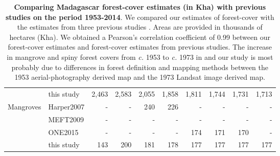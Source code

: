 \documentclass[a4paper, 12pt, leqno]{article} %
\begin{document}
\begin{table}[!h]
\begin{longtable}[]{@{}llrrrrrrrr@{}}
                & this study & 2,463 & 2,583 & 2,055 & 1,858 & 1,811 & 1,744 & 1,731 &
                                                                                       1,713 \\
    Mangroves & Harper2007 & - & - & 240 & 226 & - & - & - &
                                                             - \\
                & MEFT2009 & - & - & - & - & - & - & - & - \\
                & ONE2015 & - & - & - & - & 174 & 171 & 170 & - \\
                & this study & 143 & 200 & 181 & 178 & 177 & 177 & 177 &
                                                                         177 \\
    \bottomrule
  \end{longtable}%
  \addtocounter{table}{-1}

  \caption{\textbf{Comparing Madagascar forest-cover estimates (in
      Kha) with previous studies on the period 1953-2014}. We compared
    our estimates of forest-cover with the estimates from three
    previous studies \citep{Harper2007, MEFT2009, ONE2015}. Areas are
    provided in thousands of hectares (Kha). We obtained a Pearson's
    correlation coefficient of 0.99 between our forest-cover estimates
    and forest-cover estimates from previous studies. The increase in
    mangrove and spiny forest covers from \emph{c.} 1953 to \emph{c.}
    1973 in \citet{Harper2007} and our study is most probably due to
    differences in forest definition and mapping methods between the
    1953 aerial-photography derived map and the 1973 Landsat image
    derived map.}

  \label{tab:comp_forest}
\end{table}

\newpage
\end{document}
